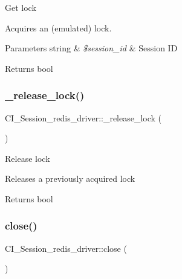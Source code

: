 Get lock

Acquires an (emulated) lock.


\begin{DoxyParams}[1]{Parameters}
string & {\em \$session\+\_\+id} & Session ID \\
\hline
\end{DoxyParams}
\begin{DoxyReturn}{Returns}
bool 
\end{DoxyReturn}
\mbox{\label{class_c_i___session__redis__driver_adf871335e5536b19b146185a92aff310}} 
\subsubsection{\texorpdfstring{\+\_\+release\+\_\+lock()}{\_release\_lock()}}
{\footnotesize\ttfamily C\+I\+\_\+\+Session\+\_\+redis\+\_\+driver\+::\+\_\+release\+\_\+lock (\begin{DoxyParamCaption}{ }\end{DoxyParamCaption})\hspace{0.3cm}{\ttfamily [protected]}}

Release lock

Releases a previously acquired lock

\begin{DoxyReturn}{Returns}
bool 
\end{DoxyReturn}
\mbox{\label{class_c_i___session__redis__driver_a80a607cb3ba4058bca739f4c736e52bd}} 
\subsubsection{\texorpdfstring{close()}{close()}}
{\footnotesize\ttfamily C\+I\+\_\+\+Session\+\_\+redis\+\_\+driver\+::close (\begin{DoxyParamCaption}{ }\end{DoxyParamCaption})}

